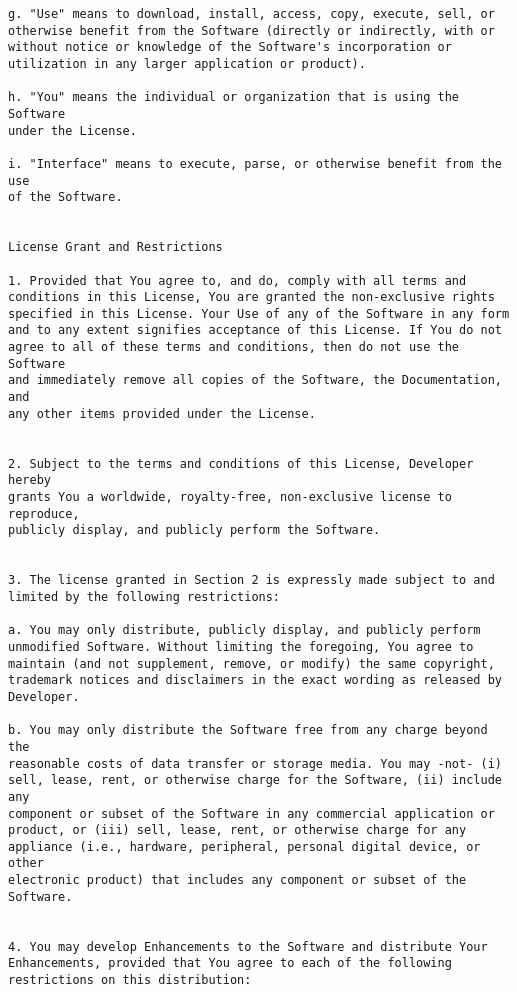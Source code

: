 \documentclass{report}
\begin{document}
{\begin{verbatim}
g. "Use" means to download, install, access, copy, execute, sell, or 
otherwise benefit from the Software (directly or indirectly, with or 
without notice or knowledge of the Software's incorporation or 
utilization in any larger application or product).

h. "You" means the individual or organization that is using the Software 
under the License. 

i. "Interface" means to execute, parse, or otherwise benefit from the use 
of the Software. 


License Grant and Restrictions

1. Provided that You agree to, and do, comply with all terms and 
conditions in this License, You are granted the non-exclusive rights 
specified in this License. Your Use of any of the Software in any form 
and to any extent signifies acceptance of this License. If You do not 
agree to all of these terms and conditions, then do not use the Software 
and immediately remove all copies of the Software, the Documentation, and 
any other items provided under the License. 


2. Subject to the terms and conditions of this License, Developer hereby 
grants You a worldwide, royalty-free, non-exclusive license to reproduce, 
publicly display, and publicly perform the Software.


3. The license granted in Section 2 is expressly made subject to and 
limited by the following restrictions: 

a. You may only distribute, publicly display, and publicly perform 
unmodified Software. Without limiting the foregoing, You agree to 
maintain (and not supplement, remove, or modify) the same copyright, 
trademark notices and disclaimers in the exact wording as released by 
Developer. 

b. You may only distribute the Software free from any charge beyond the 
reasonable costs of data transfer or storage media. You may -not- (i) 
sell, lease, rent, or otherwise charge for the Software, (ii) include any 
component or subset of the Software in any commercial application or 
product, or (iii) sell, lease, rent, or otherwise charge for any 
appliance (i.e., hardware, peripheral, personal digital device, or other 
electronic product) that includes any component or subset of the 
Software. 


4. You may develop Enhancements to the Software and distribute Your 
Enhancements, provided that You agree to each of the following 
restrictions on this distribution:


\end{verbatim}}
\end{document}
